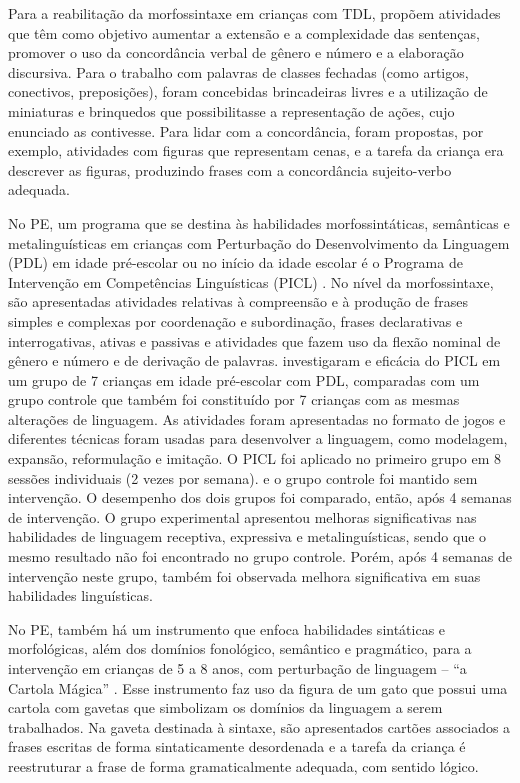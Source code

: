 \documentclass[output=paper,colorlinks,citecolor=brown,booklanguage=portuguese]{langscibook}
\begin{document}
Para a reabilitação da morfossintaxe em crianças com TDL, \citet{BefiLopes2013a} propõem atividades que têm como objetivo aumentar a extensão e a complexidade das sentenças, promover o uso da concordância verbal de gênero e número e a elaboração discursiva. Para o trabalho com palavras de classes fechadas (como artigos, conectivos, preposições), foram concebidas brincadeiras livres e a utilização de miniaturas e brinquedos que possibilitasse a representação de ações, cujo enunciado as contivesse. Para lidar com a concordância, foram propostas, por exemplo, atividades com figuras que representam cenas, e a tarefa da criança era descrever as figuras, produzindo frases com a concordância sujei\-to-verbo adequada.  

No PE, um programa que se destina às habilidades morfossintáticas, semânticas e metalinguísticas em crianças com Perturbação do Desenvolvimento da Linguagem (PDL) em idade pré-escolar ou no início da idade escolar é o Programa de Intervenção em Competências Linguísticas (PICL) \citep{Lousada2016a}. No nível da morfossintaxe, são apresentadas atividades relativas à compreensão e à produção de frases simples e complexas por coordenação e subordinação, frases declarativas e interrogativas, ativas e passivas e atividades que fazem uso da flexão nominal de gênero e número e de derivação de palavras. \citet{Lousada2016b} investigaram e eficácia do PICL em um grupo de 7 crianças em idade pré-escolar com PDL, comparadas com um grupo controle que também foi constituído por 7 crianças com as mesmas alterações de linguagem. As atividades foram apresentadas no formato de jogos e diferentes técnicas foram usadas para desenvolver a linguagem, como modelagem, expansão, reformulação e imitação. O PICL foi aplicado no primeiro grupo em 8 sessões individuais (2 vezes por semana). e o grupo controle foi mantido sem intervenção. O desempenho dos dois grupos foi comparado, então, após 4 semanas de intervenção. O grupo experimental apresentou melhoras significativas nas habilidades de linguagem receptiva, expressiva e metalinguísticas, sendo que o mesmo resultado não foi encontrado no grupo controle. Porém, após 4 semanas de intervenção neste grupo, também foi observada melhora significativa em suas habilidades linguísticas. 

No PE, também há um instrumento que enfoca habilidades sintáticas e morfológicas, além dos domínios fonológico, semântico e pragmático, para a intervenção em crianças de 5 a 8 anos, com perturbação de linguagem -- “a Cartola Mágica” \citep{Dias2015}.  Esse instrumento faz uso da figura de um gato que possui uma cartola com gavetas que simbolizam os domínios da linguagem a serem trabalhados. Na gaveta destinada à sintaxe, são apresentados cartões associados a frases escritas de forma sintaticamente desordenada e a tarefa da criança é reestruturar a frase de forma gramaticalmente adequada, com sentido lógico. 
\end{document}
